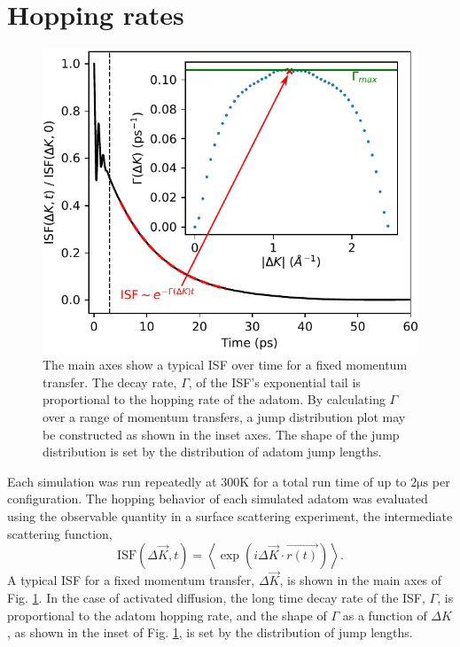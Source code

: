 \documentclass[7pt]{article}
\newcommand{\us}{\si{\micro\second}}
\newcommand{\K}{\si{\kelvin}}
\begin{document}
\section*{Hopping rates}

\begin{figure}
	\centering
	\includegraphics[width=1.0\columnwidth]{isf_dk}
	\caption{The main axes show a typical ISF over time for a fixed momentum transfer. The decay rate, $\Gamma$, of the ISF's exponential tail is proportional to the hopping rate of the adatom. By calculating $\Gamma$ over a range of momentum transfers, a jump distribution plot may be constructed as shown in the inset axes. The shape of the jump distribution is set by the distribution of adatom jump lengths.} 
	\label{fig:isf_dk}
\end{figure}

Each simulation was run repeatedly at $300\K$ for a total run time of up to $2\us$ per configuration. The hopping behavior of each simulated adatom was evaluated using the observable quantity in a surface scattering experiment, the intermediate scattering function,
$$
\mathrm{ISF}(\Delta{\vec{K}}, t) = \left<\exp\left(i\Delta{\vec{K}}\cdot\vec{r(t)}\right)\right>.
$$
A typical ISF for a fixed momentum transfer, $\Delta{\vec{K}}$, is shown in the main axes of Fig. \ref{fig:isf_dk}. In the case of activated diffusion, the long time decay rate of the ISF, $\Gamma$, is proportional to the adatom hopping rate, and the shape of $\Gamma$ as a function of $\Delta{K}$, as shown in the inset of Fig. \ref{fig:isf_dk}, is set by the distribution of jump lengths.
\end{document}
